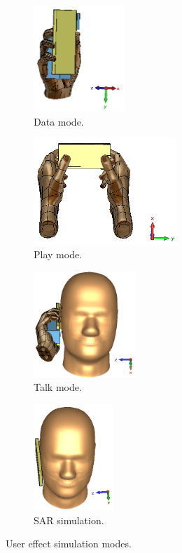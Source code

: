 \begin{figure}[htbp]
  \centering
  \begin{subfigure}[b]{0.24\linewidth}
        \centering
        \includegraphics[width=\linewidth, height=4cm, keepaspectratio]{img/tech_sol/usereff_intro/usereff_onehand}
        \caption{Data mode.}
        \label{fig:usereff_onehand}
    \end{subfigure}
    \hfill
    \begin{subfigure}[b]{0.24\linewidth}
        \centering
        \includegraphics[width=\linewidth, height=4cm, keepaspectratio]{img/tech_sol/usereff_intro/usereff_twohand}
        \caption{Play mode.}
        \label{fig:usereff_twohand}
    \end{subfigure}
    \hfill
    \begin{subfigure}[b]{0.24\linewidth}
        \centering
        \includegraphics[width=\linewidth, height=4cm, keepaspectratio]{img/tech_sol/usereff_intro/usereff_headhand}
        \caption{Talk mode.}
        \label{fig:usereff_headhand}
    \end{subfigure}
    \hfill
    \begin{subfigure}[b]{0.24\linewidth}
        \centering
        \includegraphics[width=\linewidth, height=4cm, keepaspectratio]{img/tech_sol/usereff_intro/usereff_sar}
        \caption{SAR simulation.}
        \label{fig:usereff_sar}
    \end{subfigure}
    \caption{User effect simulation modes.}
    \label{fig:usereff_intro}
\end{figure}
